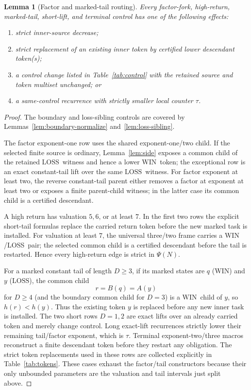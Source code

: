 \documentclass[11pt]{article}
\newtheorem{lemma}[theorem]{Lemma}
\newcommand{\WIN}{\ensuremath{\mathrm{WIN}}}
\newcommand{\LOSS}{\ensuremath{\mathrm{LOSS}}}
\begin{document}
\begin{lemma}[Factor and marked-tail routing]\label{lem:factor-routing}
Every factor-fork, high-return, marked-tail, short-lift, and terminal control
has one of the following effects:
\begin{enumerate}[label=(\alph*)]
\item strict inner-source decrease;
\item strict replacement of an existing inner token by certified lower
      descendant token(s);
\item a control change listed in Table~\ref{tab:control} with the retained
      source and token multiset unchanged; or
\item a same-control recurrence with strictly smaller local counter $\tau$.
\end{enumerate}
\end{lemma}

\begin{proof}
The boundary and loss-sibling controls are covered by Lemmas~\ref{lem:boundary-normalize} and~\ref{lem:loss-sibling}.

The factor exponent-one row uses the shared exponent-one/two child. If the
selected finite source is ordinary, Lemma~\ref{lem:side} exposes a common
child of the retained \LOSS\ witness and hence a lower \WIN\ token; the
exceptional row is an exact constant-tail lift over the same \LOSS\ witness.
For factor exponent at least two, the reverse constant-tail parent either
removes a factor at exponent at least two or exposes a finite parent-child
witness; in the latter case its common child is a certified descendant.

A high return has valuation $5,6$, or at least $7$. In the first two rows the
explicit short-tail formulas replace the carried return token before the new
marked task is installed. For valuation at least $7$, the universal
three/two frame carries a \WIN/LOSS\ pair; the selected common child is a
certified descendant before the tail is restarted. Hence every high-return
edge is strict in $\Psi(N)$.

For a marked constant tail of length $D\ge3$, if its marked states are
$q$ (\WIN) and $y$ (\LOSS), the common child
\[
  r=B(q)=A(y)
\]
for $D\ge4$ (and the boundary common child for $D=3$) is a \WIN\ child of
$y$, so $h(r)<h(y)$. Thus the existing token $y$ is replaced before any new
inner task is installed. The two short rows $D=1,2$ are exact lifts over an
already carried token and merely change control. Long exact-lift recurrences
strictly lower their remaining tail/factor exponent, which is $\tau$.
Terminal exponent-two/three macros reconstruct a finite descendant token
before they restart any obligation. The strict token replacements used in these rows are collected explicitly in Table~\ref{tab:tokens}. These cases exhaust the factor/tail constructors because their only unbounded parameters are the valuation and tail intervals just split above.
\end{proof}
\end{document}
